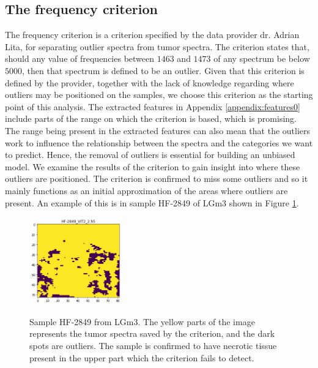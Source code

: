 \subsection{The frequency criterion}

The frequency criterion is a criterion specified by the data provider dr. Adrian Lita,  for separating outlier spectra from tumor spectra. The criterion states that, should any value of frequencies between $1463$ and $1473$ of any spectrum be below $5000$, then that spectrum is defined to be an outlier. Given that this criterion is defined by the provider, together with the lack of knowledge regarding where outliers may be positioned on the samples, we choose this criterion as the starting point of this analysis. The extracted features in Appendix \ref{appendix:features0} include parts of the range on which the criterion is based, which is promising. The range being present in the extracted features can also mean that the outliers work to influence the relationship between the spectra and the categories we want to predict. Hence, the removal of outliers is essential for building an unbiased model. We examine the results of the criterion to gain insight into where these outliers are positioned. The criterion is confirmed to miss some outliers and so it mainly functions as an initial approximation of the areas where outliers are present. An example of this is in sample HF-2849 of LGm3 shown in Figure \ref{fig:HF2849_1}.

\begin{figure}[H]

    \centering
{\includegraphics[width=4cm]{images/AdriansCriterion/LGm-3/HF-2849_VIT2_2.h5_5.png} }
\caption{Sample HF-2849 from LGm3. The yellow parts of the image represents the tumor spectra saved by the criterion, and the dark spots are outliers. The sample is confirmed to have necrotic tissue present in the upper part which the criterion fails to detect.\label{fig:HF2849_1}}%

\end{figure}

